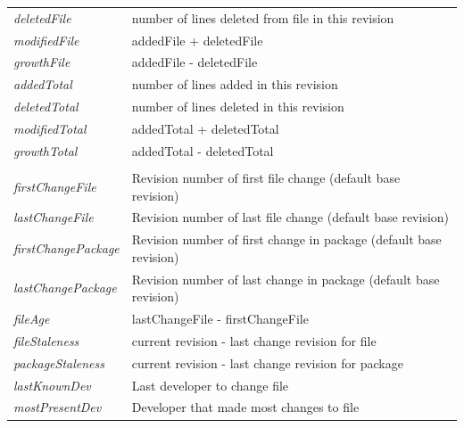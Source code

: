 \begin{table}[H]
\begin{tabular}{@{}ll@{}}
		\textit{deletedFile}        & number of lines deleted from file in this revision                 \\
		\textit{modifiedFile}       & addedFile + deletedFile                                            \\
		\textit{growthFile}         & addedFile - deletedFile                                            \\
		\textit{addedTotal}         & number of lines added in this revision                             \\
		\textit{deletedTotal}       & number of lines deleted in this revision                           \\
		\textit{modifiedTotal}      & addedTotal + deletedTotal                                          \\
		\textit{growthTotal}        & addedTotal - deletedTotal                                          \\
		\textit{}                   &                                                                    \\
		\textit{firstChangeFile}    & Revision number of first file change (default base revision)       \\
		\textit{lastChangeFile}     & Revision number of last file change (default base revision)        \\
		\textit{firstChangePackage} & Revision number of first change in package (default base revision) \\
		\textit{lastChangePackage}  & Revision number of last change in package (default base revision)  \\
		\textit{fileAge}            & lastChangeFile - firstChangeFile                                   \\
		\textit{fileStaleness}      & current revision - last change revision for file                   \\
		\textit{packageStaleness}   & current revision - last change revision for package                \\
		\textit{lastKnownDev}       & Last developer to change file                                      \\
		\textit{mostPresentDev}     & Developer that made most changes to file                           \\ \bottomrule
	\end{tabular}
\end{table}


